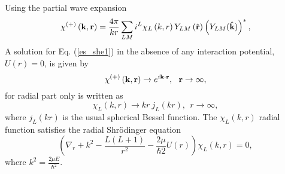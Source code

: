 \documentclass[
12pt, %
oneside, %
english, %
onehalfspacing, %
onehalfspacing, %
headsepline, %
]{MastersDoctoralThesis} %
\begin{document}
Using the partial wave expansion 
\begin{equation}
\chi^{(+)} \left( {\bf k}, {\bf r} \right) = 
\frac{4 \pi}{kr} \sum_{LM} i^{L} \chi_L \left( k,r \right) 
Y_{LM}\left( \hat{{\bf r}}\right) \left( Y_{LM}( \hat{{\bf k}})\right)^{*},
\end{equation}
A solution for Eq. (\ref{es_she1}) in the absence of any interaction potential, $U \left( r \right) = 0$, is given by 
\begin{equation}
\chi^{(+)} \left( {\bf k}, {\bf r} \right) \rightarrow
e^{i {\bf k} \cdot {\bf r}}, ~~ {\bf r} \rightarrow \infty, 
\end{equation}
for radial part only is written as
\begin{equation}
\chi_L \left( k,r \right)  \rightarrow kr~j_L \left(kr \right),
~~ r \rightarrow \infty,
\end{equation}
where $j_L \left(kr \right)$ is the usual spherical Bessel function. The $\chi_L \left( k,r \right)$ radial function satisfies the radial Shr\"{o}dinger equation
\begin{equation}
\left( \nabla_r + k^2 - \frac{L(L+1)}{r^2} - \frac{2 \mu}{\hbar2} U \left( r \right)\right) \chi_L \left( k,r \right) =0,
\label{es_she_radial}
\end{equation}
where $k^2 = \frac{2\mu E}{\hbar^2}$.
\end{document}
